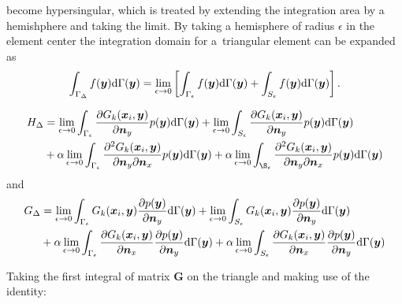 \documentclass[a4paper, 10pt]{article}
\newcommand{\td}{\mathrm{d}}
\newcommand{\sx}{\bm{\mathnormal{x}}}
\newcommand{\sy}{\bm{\mathnormal{y}}}
\newcommand{\sn}{\bm{\mathnormal{n}}}
\newcommand{\bH}{\mathbf{H}}
\newcommand{\bG}{\mathbf{G}}
\newcommand{\limeps}{\lim\limits_{\epsilon \rightarrow 0}}
\begin{document}
become hypersingular, which is treated by extending the integration area by a hemishphere and taking the limit.
By taking a hemisphere of radius $\epsilon$ in the element center the integration domain for a~triangular element can be expanded as
%
\begin{align}
	\int_{\Gamma_\Delta} f(\sy)\td\Gamma(\sy) = \lim\limits_{\epsilon \rightarrow 0 }\left[\int_{\Gamma_\epsilon} f(\sy) \td \Gamma(\sy) + \int_{S_{\epsilon}} f(\sy) \td \Gamma (\sy) \right] .
\end{align}
%

%
\begin{align}
	H_\Delta
	& = \limeps \int_{\Gamma_\epsilon}\frac{\partial{G}_k (\sx_i, \sy)}{\partial \sn_y} p(\sy) \td \Gamma(\sy)
    + \limeps \int_{S_\epsilon}\frac{\partial{G}_k (\sx_i, \sy)}{\partial \sn_y} p(\sy) \td \Gamma(\sy) \nonumber \\
	& + \alpha \limeps \int_{\Gamma_\epsilon} \frac{\partial^2{G}_k (\sx_i, \sy)}{\partial \sn_y \partial \sn_x} p(\sy) \td \Gamma(\sy) 
    + \alpha \limeps \int_{\S_\epsilon} \frac{\partial^2{G}_k (\sx_i, \sy)}{\partial \sn_y \partial \sn_x} p(\sy) \td \Gamma(\sy) 
\end{align}
%
and
%
\begin{align}
	G_\Delta & = \limeps \int_{\Gamma_\epsilon} G_k(\sx_i,\sy) \frac{\partial p(\sy)}{\partial \sn_y}\td \Gamma(\sy) +
	\limeps \int_{S_\epsilon} G_k(\sx_i, \sy) \frac{\partial p(\sy)}{\partial \sn_y} \td \Gamma(\sy) \nonumber \\
	& + \alpha \limeps \int_{\Gamma_\epsilon} \frac{\partial{G}_k (\sx_i, \sy)}{\partial \sn_x} \frac{\partial p(\sy)}{\partial \sn_y} \td \Gamma(\sy)
	+ \alpha \limeps \int_{S_\epsilon} \frac{\partial{G}_k (\sx_i, \sy)}{\partial \sn_x} \frac{\partial p(\sy)}{\partial \sn_y} \td \Gamma(\sy)
\end{align}

Taking the first integral of matrix $\bG$ on the triangle and making use of the identity:
\end{document}
